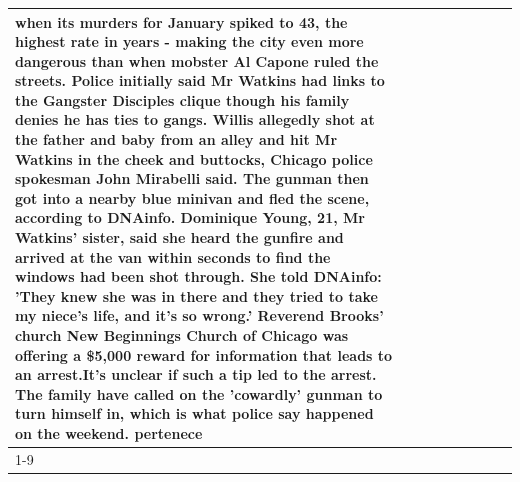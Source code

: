 \begin{table}[H]
\begin{tabular}{lllrlllll}
when its murders for January spiked to 43, the highest rate in years - making the city even more dangerous than when mobster Al Capone ruled the streets. Police initially said Mr Watkins had links to the Gangster Disciples clique though his family denies he has ties to gangs. Willis allegedly shot at the father and baby from an alley and hit Mr Watkins in the cheek and buttocks, Chicago police spokesman John Mirabelli said. The gunman then got into a nearby blue minivan and fled the scene, according to DNAinfo. Dominique Young, 21, Mr Watkins' sister, said she heard the gunfire and arrived at the van within seconds to find the windows had been shot through. She told DNAinfo: 'They knew she was in there and they tried to take my niece's life, and it's so wrong.' Reverend Brooks' church New Beginnings Church of Chicago was offering a \$5,000 reward for information that leads to an arrest.It's unclear if such a tip led to the arrest. The family have called on the 'cowardly' gunman to turn himself in, which is what police say happened on the weekend. pertenece \\
\cline{1-9}

\end{tabular}
\end{table}
